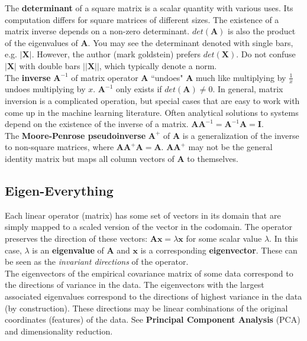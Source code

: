 \documentclass{harvardml}
\theoremstyle{definition}
\theoremstyle{plain}
\renewcommand{\v}[1]{\mathbf{#1}}
\begin{document}
		\noindent The \textbf{determinant} of a square matrix is a 
		scalar quantity with various uses. Its computation differs 
		for square matrices of different sizes. The existence of a 
		matrix inverse depends on a non-zero determinant. 
		$det(\mathbf{A})$ is also the product 
        of the eigenvalues of $\mathbf{A}$. You may see the determinant
        denoted with single bars, e.g. $|\v X |$. However, the
		author (mark goldstein) prefers $det(\v X)$. 
		Do not confuse $| \v X|$ with double bars 
		$||\v X||$, which typically denote a norm.\\
		
		\noindent The \textbf{inverse} $\mathbf{A}^{-1}$ of matrix operator 
		$\mathbf{A}$ ``undoes" $\mathbf{A}$ much like multiplying by 
        $\frac{1}{x}$ undoes multiplying by $x$. $\mathbf{A}^{-1}$ 
        only exists if $det(\mathbf{A}) \neq 0$. In general, matrix 
        inversion is a complicated operation, but special cases that 
        are easy to work with come up in the machine learning literature. 
        Often analytical solutions to systems depend on the existence of 
        the inverse of a matrix. $\mathbf{A}\mathbf{A}^{-1} = 
        \mathbf{A}^{-1}\mathbf{A} = \mathbf{I}$.\\
		
		\noindent The \textbf{Moore-Penrose pseudoinverse} $\mathbf{A}^+$ of 
        $\mathbf{A}$ is a generalization of the inverse to 
        non-square matrices, where $\mathbf{A}\mathbf{A}^+\mathbf{A} 
        = \mathbf{A}$. $\mathbf{A}\mathbf{A}^+$ may not be the general 
    	identity matrix but maps all column vectors of $\mathbf{A}$ to 
        themselves.

    \subsection{Eigen-Everything}
        Each linear operator (matrix) has some set of vectors in its domain
        that are simply mapped to a scaled version of the vector
        in the codomain. The operator preserves the direction of these vectors:
        $\mathbf{Ax} = \lambda\mathbf{x}$ for some scalar value $\lambda$. 
        In this case, $\lambda$ is an \textbf{eigenvalue} of $\mathbf{A}$ and 
        $\mathbf{x}$ is a corresponding \textbf{eigenvector}. These can be seen
        as the \textit{invariant directions} of the operator.\\

    	\noindent The eigenvectors of the empirical covariance 
        matrix of some data correspond to the directions
        of variance in the data. The eigenvectors with the
        largest associated eigenvalues correspond to the directions
        of highest variance in the data (by construction). 
		These directions may be linear combinations of the original 
		coordinates (features) of the data. See 
		\textbf{Principal Component Analysis} (PCA) 
        and dimensionality reduction.\\
                  
\end{document}
